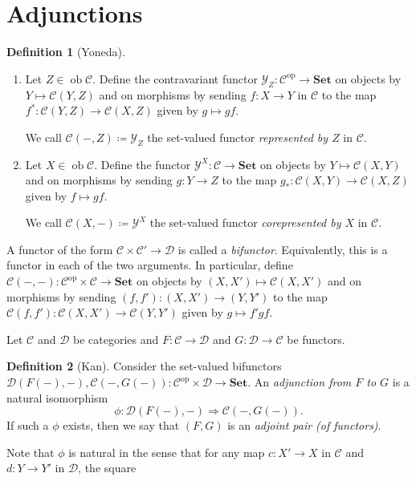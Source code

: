 \documentclass[10pt,letterpaper,cm]{nupset}
\theoremstyle{definition}
\newtheorem{definition}{Definition}[section]
\theoremstyle{theorem}
\theoremstyle{remark}
\newcommand{\1}{\mathbf{1}}
\renewcommand{\c}{\mathscr{C}}
\renewcommand{\d}{\mathscr{D}}
\newcommand{\y}{\mathcal{Y}}
\newcommand{\0}{\vec 0}
\DeclareMathOperator{\op}{op}
\DeclareMathOperator{\ob}{ob}
\begin{document}
\section{Adjunctions}

\begin{definition}[Yoneda] $ $
\begin{enumerate}
\item Let $Z \in \ob \c$. Define the contravariant functor $\y_Z: \c^{\op} \to \mathbf{Set}$  on objects by $Y \mapsto \c(Y, Z)$ and on morphisms by sending $f: X \to Y$ in $\c$ to the map $f^{\ast} : \c(Y, Z) \to \c(X, Z)$ given by $g\mapsto gf$. 

We call $\c(-, Z)\coloneqq \y_Z$ the set-valued functor \textit{represented by $Z$} in $\c$.
\item Let $X \in \ob \c$. Define the functor $\y^X : \c \to \mathbf{Set}$ on objects by $Y \mapsto \c(X, Y)$  and on morphisms by sending $g: Y \to Z$ to the map $g_{\ast} : \c(X, Y) \to \c(X, Z)$ given by $f \mapsto gf$. 

We call $\c(X, -)\coloneqq\y^X$ the set-valued functor \textit{corepresented by $X$} in $\c$.
\end{enumerate}
\end{definition}

\smallskip

A functor of the form $\c \times \c' \to \d$ is called a \textit{bifunctor}. Equivalently, this is a functor in each of the two arguments.
In particular, define $\c(-, -): \c^{\op} \times \c \to \mathbf{Set}$ on objects by $\left(X, X'\right) \mapsto \c(X, X')$ and on morphisms by sending $\left(f, f'\right) : \left(X, X'\right) \to \left(Y, Y'\right)$ to the map $\c(f, f') : \c(X, X') \to \c(Y, Y')$ given by $g \mapsto {f'}{g}{f}$.

\medskip

Let $\c$ and $\d$ be categories and $F : \c \to \d$ and $G: \d \to \c$ be functors. 


\begin{definition}[Kan]
Consider the set-valued bifunctors $ \d(F(-), -), \c(-, G(-)): \c^{\op} \times \d \to \mathbf{Set}$. An \textit{adjunction from $F$ to $G$} is a natural isomorphism $$\phi : \d(F(-), -) \Rightarrow \c(-, G(-)).$$
If such a $\phi$ exists, then we say that $\left(F, G\right)$ is an \textit{adjoint pair (of functors)}. 
\end{definition}

\smallskip


Note that $\phi$ is natural in the sense that for any map $c: X' \to X$ in $\c$ and $d: Y \to Y'$ in $\d$, the square
\end{document}
